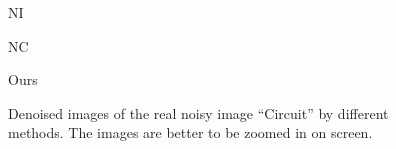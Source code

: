 \begin{figure}
{\begin{minipage}[t]{0.19\textwidth}
{\footnotesize NI}
\end{minipage}
\begin{minipage}[t]{0.19\textwidth}
\centering
{}
{\footnotesize NC}
\end{minipage}
\begin{minipage}[t]{0.19\textwidth}
\centering
{}
{\footnotesize Ours}
\end{minipage}
}
    \caption{Denoised images of the real noisy image ``Circuit'' \cite{ncwebsite} by different methods. The images are better to be zoomed in on screen.}
    \label{fig3-11}
\end{figure}

